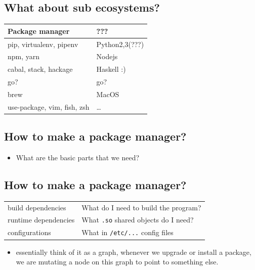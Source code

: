 \documentclass[11pt]{article}
\begin{document}
\subsection{What about sub ecosystems?}
\label{sec:orgb99cead}
\begin{center}
\begin{tabular}{ll}
Package manager & ???\\
\hline
pip, virtualenv, pipenv & Python2,3(???)\\
npm, yarn & Nodejs\\
cabal, stack, hackage & Haskell :)\\
go? & go?\\
brew & MacOS\\
use-package, vim, fish, zsh & \ldots{}\\
\end{tabular}
\end{center}
\subsection{How to make a package manager?}
\label{sec:org0dbdef6}
\begin{itemize}
\item What are the basic parts that we need?
\end{itemize}
\subsection{How to make a package manager?}
\label{sec:orgcf364f7}
\begin{center}
\begin{tabular}{ll}
build dependencies & What do I need to build the program?\\
runtime dependencies & What \texttt{.so} shared objects do I need?\\
configurations & What in \texttt{/etc/...} config files\\
\end{tabular}
\end{center}
\begin{itemize}
\item essentially think of it as a graph, whenever we upgrade or install a package,
we are mutating a node on this graph to point to something else.
\end{itemize}
\end{document}
